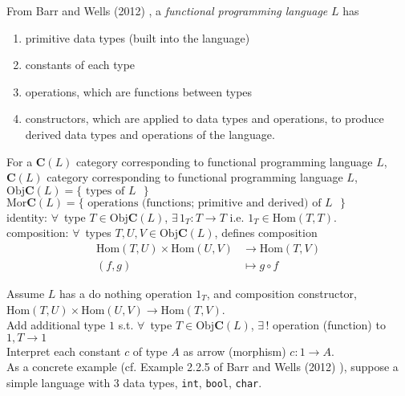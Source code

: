 \documentclass[10pt]{amsart}
\begin{document}
\begin{multicols*}{2}
\begin{itemize}
From Barr and Wells (2012) \cite{BaWe2012}, a \emph{functional programming language} $L$ has
\begin{enumerate}
	\item primitive data types (built into the language) 
	\item constants of each type
	\item operations, which are functions between types
	\item constructors, which are applied to data types and operations, to produce derived data types and operations of the language.	
\end{enumerate}

	For a $\mathbf{C}(L)$ category corresponding to functional programming language $L$, \\
	
	$\mathbf{C}(L)$ category corresponding to functional programming language $L$, \\
	$\text{Obj}\mathbf{C}(L) = \lbrace \text{ types of $L$ } \rbrace$ \\
	$\text{Mor}\mathbf{C}(L) = \lbrace \text{ operations (functions; primitive and derived) of $L$ } \rbrace$ \\

identity: $\forall \, $ type $T \in \text{Obj}\mathbf{C}(L)$, $\exists \, 1_T :T \to T$ i.e. $1_T \in \text{Hom}(T,T)$. \\

composition: $\forall \, $ types $T,U,V \in \text{Obj}\mathbf{C}(L)$, defines composition 
\[
\begin{aligned}
\text{Hom}(T,U) \times \text{Hom}(U,V) & \to \text{Hom}(T,V) \\ 
(f,g) & \mapsto g \circ f
\end{aligned}
\]

Assume $L$ has a do nothing operation $1_T$, and composition constructor, $\text{Hom}(T,U) \times \text{Hom}(U,V) \to \text{Hom}(T, V)$. \\

Add additional type $1$ s.t. $\forall \, $ type $T \in \text{Obj}\mathbf{C}(L)$, $\exists \, !$ operation (function) to $1, T \to 1$ \\
Interpret each constant $c$ of type $A$ as arrow (morphism) $c:1\to A$.  \\

As a concrete example (cf. Example 2.2.5 of Barr and Wells (2012) \cite{BaWe2012}), suppose a simple language with 3 data types, \texttt{int}, \texttt{bool}, \texttt{char}. \\


\end{itemize}
\end{multicols*}
\end{document}
